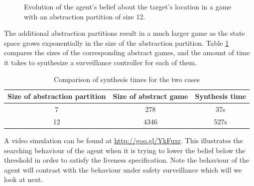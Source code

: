 \begin{figure}
\begin{minipage}{5.0cm}
	\end{minipage}
	
	
	\caption{Evolution of the agent's belief about the target's location in a game  with an abstraction partition of size 12.
	}
	\label{fig:case1fineexp}
	
\end{figure}




The additional abstraction partitions result in a much larger game as the state space grows exponentially in the size of the abstraction partition. Table \ref{tab:exp1} compares the sizes of the corresponding abstract games, and the amount of time it takes to synthesize a surveillance controller for each of them.


\begin{table}[h!]
	\centering
	\begin{tabular}{c|c|c}
	Size of abstraction partition & Size of abstract game & Synthesis time \\ \hline \hline
		7 & 278 & 37s \\ 
		12 & 4346 & 527s \\ 
	\end{tabular}\caption{Comparison of synthesis times for the two cases} \label{tab:exp1}
\end{table}


A video simulation can be found at \url{http://goo.gl/YkFuxr}. This illustrates the searching behaviour of the agent when it is trying to lower the belief below the threshold in order to satisfy the liveness specification. Note the behaviour of the agent will contrast with the behaviour under safety surveillance which will we look at next.

